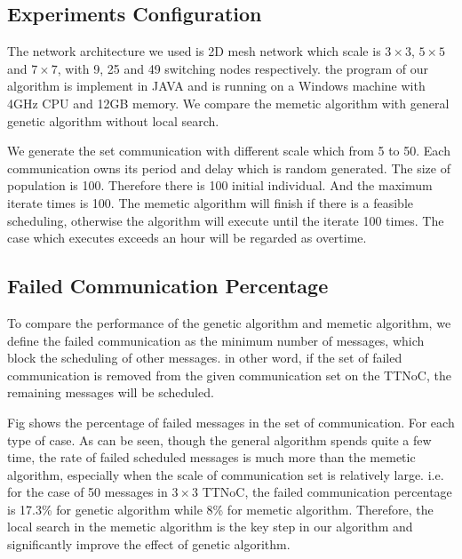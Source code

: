 \documentclass[conference]{IEEEtran}
\begin{document}
\subsection{Experiments Configuration}

The network architecture we used is 2D mesh network which scale is $3\times 3$, $5\times 5$ and $7\times 7$, with 9, 25 and 49 switching nodes respectively. the program of our algorithm is implement in JAVA and is running on a Windows machine with 4GHz CPU and 12GB memory. We compare the memetic algorithm with general genetic algorithm without local search. 

We generate the set communication with different scale which from 5 to 50. Each communication owns its period and delay which is random generated. The size of population is 100. Therefore there is 100 initial individual. And the maximum iterate times is 100. The memetic algorithm will finish if there is a feasible scheduling, otherwise the algorithm will execute until the iterate 100 times. The case which executes exceeds an hour will be regarded as overtime.

\subsection{Failed Communication Percentage}
To compare the performance of the genetic algorithm and memetic algorithm, we define the failed communication as the minimum number of messages, which block the scheduling of other messages. in other word, if the set of failed communication is removed from the given communication set on the TTNoC, the remaining messages will be scheduled.

Fig shows the percentage of failed messages in the set of communication. For each type of case. As can be seen, though the general algorithm spends quite a few time, the rate of failed scheduled messages is much more than the memetic algorithm, especially when the scale of communication set is relatively large. i.e. for the case of 50 messages in $3\times 3$ TTNoC, the failed communication percentage is 17.3\% for genetic algorithm while 8\% for memetic algorithm. Therefore, the local search in the memetic algorithm is the key step in our algorithm and significantly improve the effect of genetic algorithm.
\end{document}
